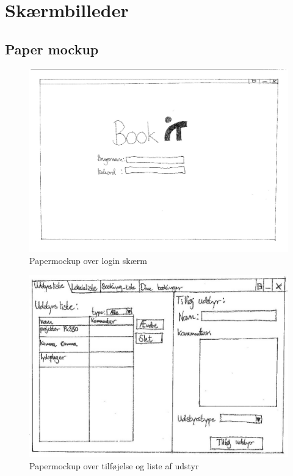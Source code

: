 \chapter{Skærmbilleder}
\label{App_GUI}

\minilof
\clearpage
\section{Paper mockup}
\label{App_GUI_paper}

\begin{figure}[h!]
  \centering
    \includegraphics[angle=90, height=0.75\textheight]{Appendix/GUI-Prototype/PaperMockup/LogIn_001}
  \caption{Papermockup over login skærm}
\label{App_GUI_paper_LogIn}
\end{figure}

\begin{figure}[h!]
  \centering
    \includegraphics[angle=90, height=0.9\textheight]{Appendix/GUI-Prototype/PaperMockup/UdstyrsListe}
  \caption{Papermockup over tilføjelse og liste af udstyr}
\label{App_GUI_paper_UdstyrsListe}
\end{figure}

